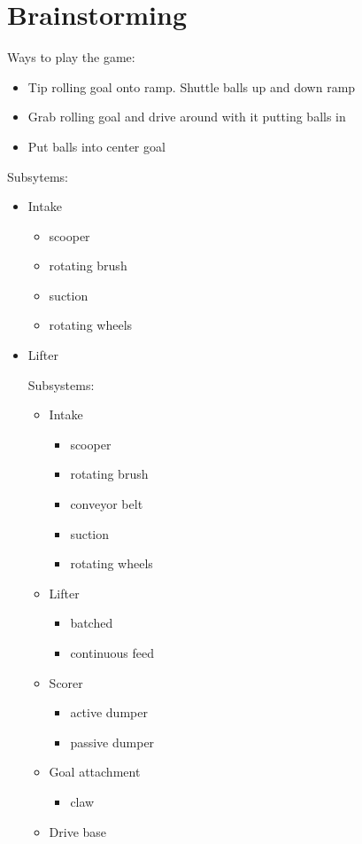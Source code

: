 \section*{Brainstorming}
Ways to play the game:
\begin{itemize}
 \item Tip rolling goal onto ramp. Shuttle balls up and down ramp
 \item Grab rolling goal and drive around with it putting balls in
 \item Put balls into center goal %
\end{itemize}
Subsytems:
\begin{itemize}
 \item Intake
 \begin{itemize}
  \item scooper
  \item rotating brush
  \item suction
  \item rotating wheels
 \end{itemize}
 \item Lifter

Subsystems:
\begin{itemize}
 \item Intake
 \begin{itemize}
  \item scooper
  \item rotating brush
  \item conveyor belt
  \item suction
  \item rotating wheels
 \end{itemize}
 \item Lifter
 \begin{itemize}
  \item batched
  \item continuous feed
 \end{itemize}
 \item Scorer
 \begin{itemize}
  \item active dumper
  \item passive dumper
 \end{itemize}
 \item Goal attachment
 \begin{itemize}
  \item claw
 \end{itemize}
 \item Drive base
\end{itemize}


\end{itemize}
